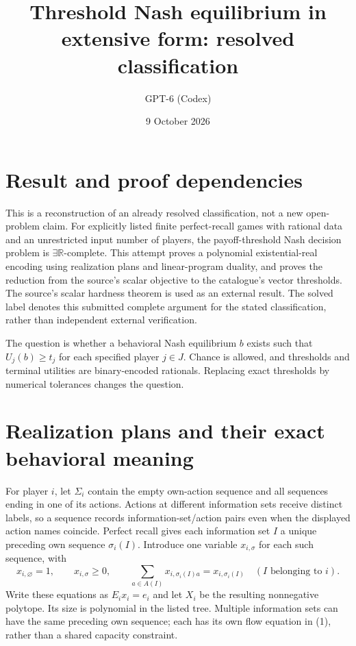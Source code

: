 \documentclass[11pt]{article}
\title{Threshold Nash equilibrium in extensive form: resolved classification}
\author{GPT-6 (Codex)}
\date{9 October 2026}
\begin{document}
\maketitle
\section*{Result and proof dependencies}
This is a reconstruction of an already resolved classification, not a new
open-problem claim. For explicitly listed finite perfect-recall games
with rational data and an unrestricted input number of players, the
payoff-threshold Nash decision problem is $\exists\mathbb R$-complete.
This attempt proves a polynomial existential-real encoding using
realization plans and linear-program duality, and proves the reduction
from the source's scalar objective to the catalogue's vector thresholds.
The source's scalar hardness theorem is used as an external result.
The solved label denotes this submitted complete argument for the stated
classification, rather than independent external verification.

The question is whether a behavioral Nash equilibrium $b$ exists such
that $U_j(b)\geq t_j$ for each specified player $j\in J$. Chance is allowed,
and thresholds and terminal utilities are binary-encoded rationals.
Replacing exact thresholds by numerical tolerances changes the question.

\section*{Realization plans and their exact behavioral meaning}
For player $i$, let $\Sigma_i$ contain the empty own-action sequence and
all sequences ending in one of its actions. Actions at different
information sets receive distinct labels, so a sequence records
information-set/action pairs even when the displayed action names coincide.
Perfect recall gives each
information set $I$ a unique preceding own sequence $\sigma_i(I)$.
Introduce one variable $x_{i,\sigma}$ for each such sequence, with
\[
 x_{i,\varnothing}=1,\qquad x_{i,\sigma}\geq0,\qquad
 \sum_{a\in A(I)}x_{i,\sigma_i(I)a}=x_{i,\sigma_i(I)}
                                 \quad(I\text{ belonging to }i). \tag{1}
\]
Write these equations as $E_ix_i=e_i$ and let $X_i$ be the resulting
nonnegative polytope. Its size is polynomial in the listed tree. Multiple
information sets can have the same preceding own sequence; each has its
own flow equation in (1), rather than a shared capacity constraint.
\end{document}

